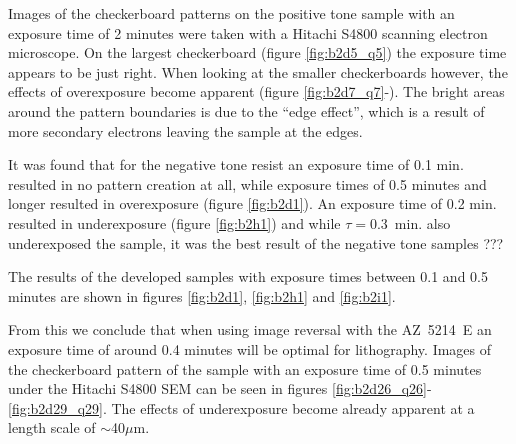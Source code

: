 Images of the checkerboard patterns on the positive tone sample with an exposure time of 2 minutes were taken with a Hitachi S4800 scanning electron microscope. On the largest checkerboard (figure \ref{fig:b2d5_q5}) the exposure time appears to be just right. When looking at the smaller checkerboards however, the effects of overexposure become apparent (figure \ref{fig:b2d7_q7}-). The bright areas around the pattern boundaries is due to the ``edge effect'', which is a result of more secondary electrons leaving the sample at the edges.


It was found that for the negative tone resist an exposure time of 0.1 min. resulted in no pattern creation at all, while exposure times of 0.5 minutes and longer resulted in overexposure (figure \ref{fig:b2d1}). An exposure time of 0.2 min. resulted in underexposure (figure \ref{fig:b2h1}) and while $\tau = 0.3$~min. also underexposed the sample, it was the best result of the negative tone samples ???

The results of the developed samples with exposure times between 0.1 and 0.5 minutes are shown in figures \ref{fig:b2d1}, \ref{fig:b2h1} and \ref{fig:b2i1}.

From this we conclude that when using image reversal with the AZ~5214~E an exposure time of around 0.4 minutes will be optimal for lithography. Images of the checkerboard pattern of the sample with an exposure time of 0.5 minutes under the Hitachi S4800 SEM can be seen in figures \ref{fig:b2d26_q26}-\ref{fig:b2d29_q29}. The effects of underexposure become already apparent at a length scale of $\sim$40$\mu$m. 


